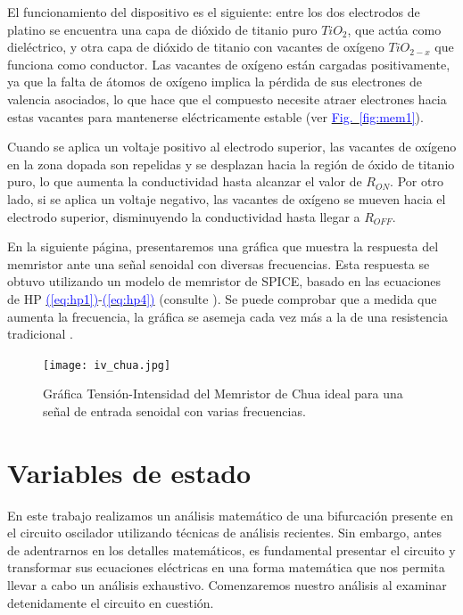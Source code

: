 \documentclass[12pt,a4paper]{report} %
\newcommand{\fref}[1]{\hyperref[#1]{\textcolor{blue}{Fig.~\ref*{#1}}}}
\newcommand{\eref}[1]{\hyperref[#1]{\textcolor{blue}{(\ref*{#1})}}}
\newcommand{\fref}[1]{\hyperref[#1]{\textcolor{blue}{\textit{Fig.~\ref*{#1}}}}}
\newcommand{\eref}[1]{\hyperref[#1]{\textcolor{blue}{\textit{(\ref*{#1})}}}}
\begin{document}
	\vspace{0.5cm}El funcionamiento del dispositivo es el siguiente: entre los dos electrodos de platino se encuentra una capa de dióxido de titanio puro $TiO_2$, que actúa como dieléctrico, y otra capa de dióxido de titanio con vacantes de oxígeno $TiO_{2-x}$ que funciona como conductor. Las vacantes de oxígeno están cargadas positivamente, ya que la falta de átomos de oxígeno implica la pérdida de sus electrones de valencia asociados, lo que hace que el compuesto necesite atraer electrones hacia estas vacantes para mantenerse eléctricamente estable (ver \fref{fig:mem1}).
	
	\vspace{0.5cm}\noindent Cuando se aplica un voltaje positivo al electrodo superior, las vacantes de oxígeno en la zona dopada son repelidas y se desplazan hacia la región de óxido de titanio puro, lo que aumenta la conductividad hasta alcanzar el valor de $R_{ON}$. Por otro lado, si se aplica un voltaje negativo, las vacantes de oxígeno se mueven hacia el electrodo superior, disminuyendo la conductividad hasta llegar a $R_{OFF}$.

	\vspace{1cm} En la siguiente página, presentaremos una gráfica que muestra la respuesta del memristor ante una señal senoidal con diversas frecuencias. Esta respuesta se obtuvo utilizando un modelo de memristor de SPICE, basado en las ecuaciones de HP \eref{eq:hp1}-\eref{eq:hp4} (consulte \cite{biolek}). Se puede comprobar que a medida que aumenta la frecuencia, la gráfica se asemeja cada vez más a la de una resistencia tradicional \cite{outsiders}.

	\newpage
	
		\begin{figure}[h]
		\centering
		\texttt{[image: iv\_chua.jpg]}
		\caption{Gráfica Tensión-Intensidad del Memristor de Chua ideal para una señal de entrada senoidal con varias frecuencias.}
		\label{fig:iv_chua}
	\end{figure}\smallskip
	
	\newpage
	
	\section{Variables de estado}
	\label{sec:23}
	\noindent En este trabajo realizamos un análisis matemático de una bifurcación presente en el circuito oscilador utilizando técnicas de análisis recientes. Sin embargo, antes de adentrarnos en los detalles matemáticos, es fundamental presentar el circuito y transformar sus ecuaciones eléctricas en una forma matemática que nos permita llevar a cabo un análisis exhaustivo. Comenzaremos nuestro análisis al examinar detenidamente el circuito en cuestión.
	
\end{document}
